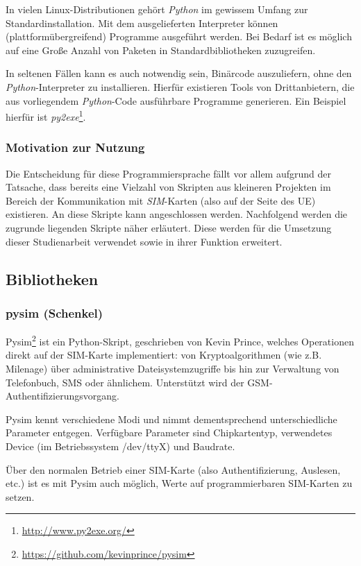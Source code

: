 In vielen Linux-Distributionen gehört \textit{Python} im gewissem Umfang zur Standardinstallation.
Mit dem ausgelieferten Interpreter können (plattformübergreifend) Programme ausgeführt werden. Bei
Bedarf ist es möglich auf eine Große Anzahl von Paketen in Standardbibliotheken zuzugreifen.

In seltenen Fällen kann es auch notwendig sein, Binärcode auszuliefern, ohne den
\textit{Python}-Interpreter zu installieren. Hierfür existieren Tools von Drittanbietern,
die aus vorliegendem \textit{Python}-Code ausführbare Programme generieren. Ein Beispiel hierfür
ist \textit{py2exe}\footnote{\url{http://www.py2exe.org/}}.

\subsubsection[Motivation zur Nutzung (Schenkel)]{Motivation zur Nutzung}
Die Entscheidung für diese Programmiersprache fällt vor allem aufgrund der Tatsache, dass bereits eine
Vielzahl von Skripten aus kleineren Projekten im Bereich der Kommunikation mit \textit{SIM}-Karten
(also auf der Seite des UE) existieren. An diese Skripte kann angeschlossen werden. Nachfolgend werden die zugrunde liegenden
Skripte näher erläutert. Diese werden für die Umsetzung dieser Studienarbeit verwendet sowie
in ihrer Funktion erweitert.

\subsection[Bibliotheken (Schenkel)]{Bibliotheken}
\subsubsection{pysim (Schenkel)}
\label{subsec:pysim}
Pysim\footnote{\url{https://github.com/kevinprince/pysim}} ist ein
Python-Skript, geschrieben von Kevin Prince,
welches Operationen direkt auf der SIM-Karte implementiert:
von Kryptoalgorithmen (wie  z.B. Milenage) über administrative Dateisystemzugriffe
bis hin zur Verwaltung von Telefonbuch, SMS oder ähnlichem.
Unterstützt wird der GSM-Authentifizierungsvorgang.

Pysim kennt verschiedene Modi und nimmt dementsprechend unterschiedliche
Parameter entgegen. Verfügbare Parameter sind Chipkartentyp, verwendetes
Device (im Betriebssystem /dev/ttyX) und Baudrate\cite{pysimprince}.

Über den normalen Betrieb einer SIM-Karte (also Authentifizierung, Auslesen, etc.)
ist es mit Pysim auch möglich, Werte auf programmierbaren SIM-Karten zu setzen.

